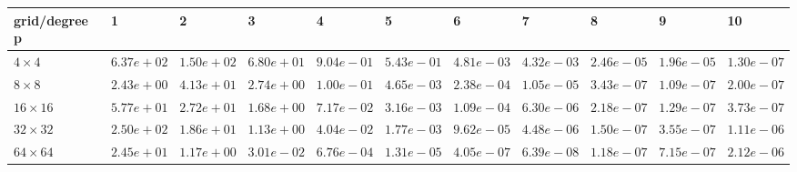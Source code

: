 \begin{tabular}{lllllllllll}
\hline
 grid/degree p   & 1          & 2          & 3          & 4          & 5          & 6          & 7          & 8          & 9          & 10         \\
\hline
 $4 \times 4$    & $6.37e+02$ & $1.50e+02$ & $6.80e+01$ & $9.04e-01$ & $5.43e-01$ & $4.81e-03$ & $4.32e-03$ & $2.46e-05$ & $1.96e-05$ & $1.30e-07$ \\
 $8 \times 8$    & $2.43e+00$ & $4.13e+01$ & $2.74e+00$ & $1.00e-01$ & $4.65e-03$ & $2.38e-04$ & $1.05e-05$ & $3.43e-07$ & $1.09e-07$ & $2.00e-07$ \\
 $16 \times 16$  & $5.77e+01$ & $2.72e+01$ & $1.68e+00$ & $7.17e-02$ & $3.16e-03$ & $1.09e-04$ & $6.30e-06$ & $2.18e-07$ & $1.29e-07$ & $3.73e-07$ \\
 $32 \times 32$  & $2.50e+02$ & $1.86e+01$ & $1.13e+00$ & $4.04e-02$ & $1.77e-03$ & $9.62e-05$ & $4.48e-06$ & $1.50e-07$ & $3.55e-07$ & $1.11e-06$ \\
 $64 \times 64$  & $2.45e+01$ & $1.17e+00$ & $3.01e-02$ & $6.76e-04$ & $1.31e-05$ & $4.05e-07$ & $6.39e-08$ & $1.18e-07$ & $7.15e-07$ & $2.12e-06$ \\
\hline
\end{tabular}